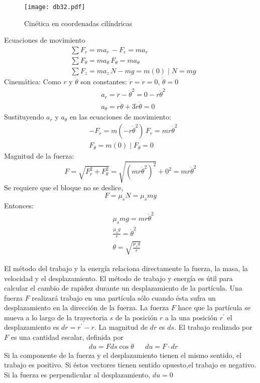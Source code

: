 \begin{figure}[h!]
\centering
  \texttt{[image: db32.pdf]}
  \caption{Cinética en coordenadas cilíndricas}
  \label{db32}
\end{figure}
Ecuaciones de movimiento
\begin{align*}
    &\sum F_r = ma_r\, - F_r = ma_r\\
    &\sum F_{\theta} = ma_{\theta}\, F_{\theta} = ma_{\theta}\\
    &\sum F_z = ma_z\, N - mg = m(0)\mid N = mg 
\end{align*}
Cinemática: Como $r$ y $\dot{\theta}$ son constantes: $\dot{r}=\ddot{r}=0$, $\ddot{\theta}=0$
\begin{align*}
    &a_r =\ddot{r} - \dot{\theta}^2 = 0 - r\dot{\theta}^2\\
    &a_{\theta} = r\ddot{\theta} + 3\dot{r}\dot{\theta} = 0
\end{align*}
Sustituyendo $a_r$ y $a_{\theta}$ en las ecuaciones de movimiento:
\begin{align*}
    &- F_r = m( - r\dot{\theta}^2)\, F_r =mr\dot{\theta}^2\\
    &F_{\theta} = m(0)\mid F_{\theta} = 0
\end{align*}
Magnitud de la fuerza:
\begin{equation*}
    F =\sqrt{F_r^2 + F_{\theta}^2} = \sqrt{\left(mr\dot{\theta}^{2}\right)^2} + 0^2 = mr\dot{\theta}^2
\end{equation*}
Se requiere que el bloque no se deslice,
\begin{equation*}
    F =\mu_s N =\mu_s mg
\end{equation*}
Entonces: 
\begin{align*}
    &\mu_s mg = mr\dot{\theta}^2\\
    &\frac{\mu_s g}{r} =\dot{\theta}^2\\
    &\theta = \sqrt{\frac{\mu_s g}{r}}
\end{align*}

El método del trabajo y la energía relaciona directamente la fuerza, la masa, la velocidad y el desplazamiento. El método de trabajo y energía es útil para calcular el cambio de rapidez durante un desplazamiento de la partícula. Una fuerza $F$ realizará trabajo en una partícula sólo cuando ésta sufra un desplazamiento en la dirección de la fuerza. La fuerza $F$ hace que la partícula se mueva a lo largo de la trayectoria $s$ de la posición $r$ a la una posición $r^{\prime}$ el desplazamiento es $dr=r^{\prime}-r$. La magnitud de $dr$ es $ds$. El trabajo realizado por $F$ es una cantidad escalar, definida por
\begin{align*}
    &du = Fds\cos{\theta}&&du = F\cdot dr
\end{align*}
Si la componente de la fuerza y el desplazamiento tienen el mismo sentido, el trabajo es positivo. Si éstos vectores tienen sentido opuesto,el trabajo es negativo. Si la fuerza es perpendicular al desplazamiento, $du=0$

